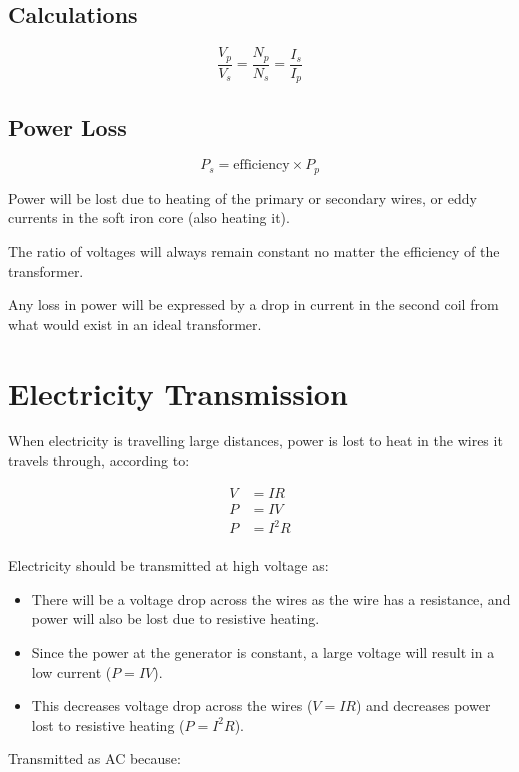\documentclass[a4paper,11pt]{report}
\begin{document}
\subsection{Calculations}

$$
\frac{V_p}{V_s} = \frac{N_p}{N_s} = \frac{I_s}{I_p}
$$

\subsection{Power Loss}

$$
P_s = \mbox{efficiency} \times P_p
$$

Power will be lost due to heating of the primary or secondary wires, or eddy
currents in the soft iron core (also heating it).

The ratio of voltages will always remain constant no matter the efficiency of
the transformer.

Any loss in power will be expressed by a drop in current in the second coil
from what would exist in an ideal transformer.


\section{Electricity Transmission}

When electricity is travelling large distances, power is lost to heat in the
wires it travels through, according to:

$$
\begin{aligned}
V & = IR \\
P & = IV \\
P & = I^2 R \\
\end{aligned}
$$

Electricity should be transmitted at high voltage as:

\begin{itemize}
\item There will be a voltage drop across the wires as the wire has a
	resistance, and power will also be lost due to resistive heating.
\item Since the power at the generator is constant, a large voltage will
	result in a low current ($P = IV$).
\item This decreases voltage drop across the wires ($V = IR$) and decreases
	power lost to resistive heating ($P = I^2R$).
\end{itemize}

Transmitted as AC because:
\end{document}
